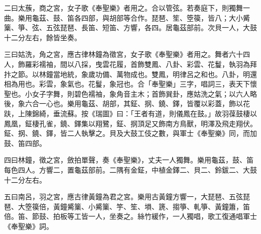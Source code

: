 \begin{pinyinscope}
 二曰太蔟，商之宮，女子歌《奉聖樂》者用之。合以管弦。若奏庭下，則獨舞一曲。樂用龜茲、鼓、笛各四部，與胡部等合作。琵琶、笙、箜篌，皆八；大小觱篥、箏、弦、五弦琵琶、長笛、短笛、方響，各四。居龜茲部前。次貝一人，大鼓十二分左右，餘皆坐奏。



 三曰姑洗，角之宮，應古律林鐘為徵宮，女子歌《奉聖樂》者用之。舞者六十四人，飾羅彩襦袖，間以八採，曳雲花履，首飾雙鳳、八卦、彩雲、花鬘，執羽為拜抃之節。以林鐘當地統，象歲功備、萬物成也。雙鳳，明律呂之和也。八卦，明還相為用也。彩雲，象氣也。花鬘，象冠也。合「奉聖樂」三字，唱詞三，表天下懷聖也。小女子字舞，則碧色襦袖，象角音主木；首飾巽卦，應姑洗之氣；以六人略後，象六合一心也。樂用龜茲、胡部，其鉦、㧏、鐃、鐸，皆覆以彩蓋，飾以花趺，上陳錦綺，垂流蘇。按《瑞圖》曰：「王者有道，則儀鳳在鼓。」故羽葆鼓棲以鳳凰，鉦棲孔雀，鐃、鐸集以翔鷺，鉦、㧏頂足又飾南方鳥獸，明澤及飛走翔伏。鉦、㧏、鐃、鐸，皆二人執擊之。貝及大鼓工伎之數，與軍士《奉聖樂》同，而加鼓、笛四部。



 四曰林鐘，徵之宮，斂拍單聲，奏《奉聖樂》，丈夫一人獨舞。樂用龜茲，鼓、笛每色四人。方響二，置龜茲部前。二隅有金鉦，中植金鐸二、貝二、鈴鈸二、大鼓十二分左右。



 五曰南呂，羽之宮，應古律黃鐘為君之宮。樂用古黃鐘方響一，大琵琶、五弦琵琶、大箜篌倍，黃鐘觱篥、小觱篥、竽、笙、塤、篪、搊箏、軋箏、黃鐘簫，笛倍。笛、節鼓、拍板等工皆一人，坐奏之。絲竹緩作，一人獨唱，歌工復通唱軍士《奉聖樂》詞。




\end{pinyinscope}
